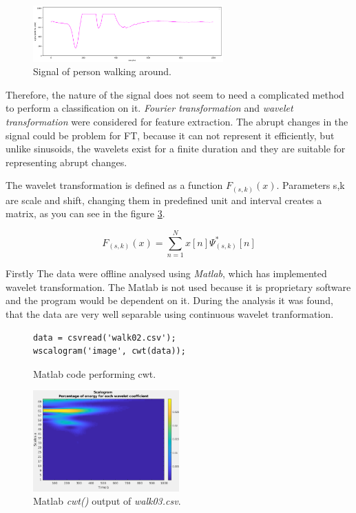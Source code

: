 \begin{figure}[h!]
\begin{center}
\includegraphics[width=0.65\textwidth]{render/signal_walk.png}
\caption{Signal of person walking around.\label{fig:signalwalk}}
\end{center}
\end{figure}

Therefore, the nature of the signal does not seem to need a complicated method to perform a classification on it.
{\it Fourier transformation} and {\it wavelet transformation} were considered for feature
extraction. The abrupt changes in the signal could be problem for FT, because it can not represent
it efficiently\cite{SinglePIR}, %
but unlike sinusoids, the wavelets exist for a finite duration and they are suitable for representing
abrupt changes.

The wavelet transformation is defined as a function $F_{(s,k)}(x)$. Parameters s,k are scale and shift, changing
them in predefined unit and interval creates a matrix, as you can see in the figure \ref{fig:walk03}.

\begin{equation}
F_{(s,k)}(x) = \sum_{n=1}^{N} x[n] \Psi_{(s,k)}^{*}[n]
\end{equation}

Firstly The data were offline analysed using {\it Matlab}, which has implemented wavelet transformation.
The Matlab is not used because it is proprietary software and the program would be dependent on it.
During the analysis it was found, that the data are very well separable using continuous wavelet tranformation.

\begin{figure}[h!]
\begin{lstlisting}[style=matlab]
data = csvread('walk02.csv');
wscalogram('image', cwt(data));
\end{lstlisting}
\caption{Matlab code performing cwt.\label{list:cwtmatlab}}
\end{figure}

\begin{figure}[h!]
\begin{center}
\includegraphics[width=0.5\textwidth]{img/walk03.png}
\caption{Matlab {\it cwt()} output of {\it walk03.csv}.\label{fig:walk03}}
\end{center}
\end{figure}


